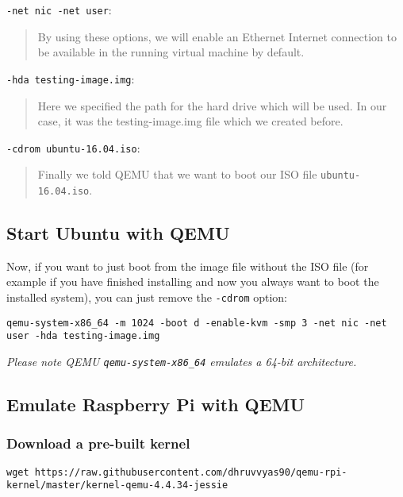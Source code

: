 \texttt{-net\ nic\ -net\ user}:

\begin{quote}
By using these options, we will enable an Ethernet Internet connection
to be available in the running virtual machine by default.
\end{quote}

\texttt{-hda\ testing-image.img}:

\begin{quote}
Here we specified the path for the hard drive which will be used. In our
case, it was the testing-image.img file which we created before.
\end{quote}

\texttt{-cdrom\ ubuntu-16.04.iso}:

\begin{quote}
Finally we told QEMU that we want to boot our ISO file
\texttt{ubuntu-16.04.iso}.
\end{quote}

\subsection{Start Ubuntu with QEMU}

Now, if you want to just boot from the image file without the ISO file
(for example if you have finished installing and now you always want to
boot the installed system), you can just remove the \texttt{-cdrom}
option:

\begin{lstlisting}
qemu-system-x86_64 -m 1024 -boot d -enable-kvm -smp 3 -net nic -net user -hda testing-image.img
\end{lstlisting}

\emph{Please note QEMU \texttt{qemu-system-x86\_64} emulates a 64-bit
architecture.}

\subsection{Emulate Raspberry Pi with QEMU}

\subsubsection{Download a pre-built kernel}

\begin{lstlisting}
wget https://raw.githubusercontent.com/dhruvvyas90/qemu-rpi-kernel/master/kernel-qemu-4.4.34-jessie
\end{lstlisting}

